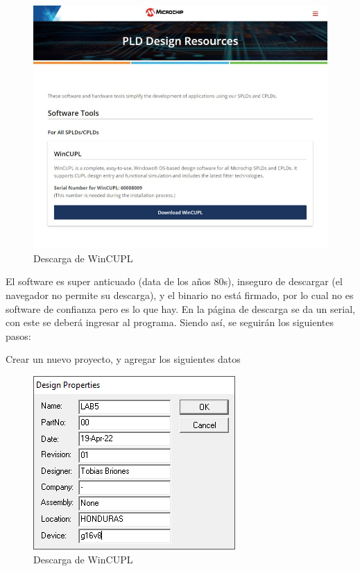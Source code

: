 \documentclass{article}
\begin{document}
    \begin{figure}[H]
        \centering
        \includegraphics[width=0.5\paperwidth]{images/microchip.com-download-wincupl}
        \caption{Descarga de WinCUPL}
    \end{figure}

    El software es super anticuado (data de los años 80s), inseguro de
    descargar (el navegador no permite su descarga), y el binario no está
    firmado, por lo cual no es software de confianza pero es lo que hay. En
    la página de descarga se da un serial, con este se deberá ingresar al
    programa. Siendo así, se seguirán los siguientes pasos:

    \bigbreak

    Crear un nuevo proyecto, y agregar los siguientes datos

    \begin{figure}[H]
        \centering
        \includegraphics[width=0.3\paperwidth]{images/wincupl-design-properties}
        \caption{Descarga de WinCUPL}
    \end{figure}
\end{document}
